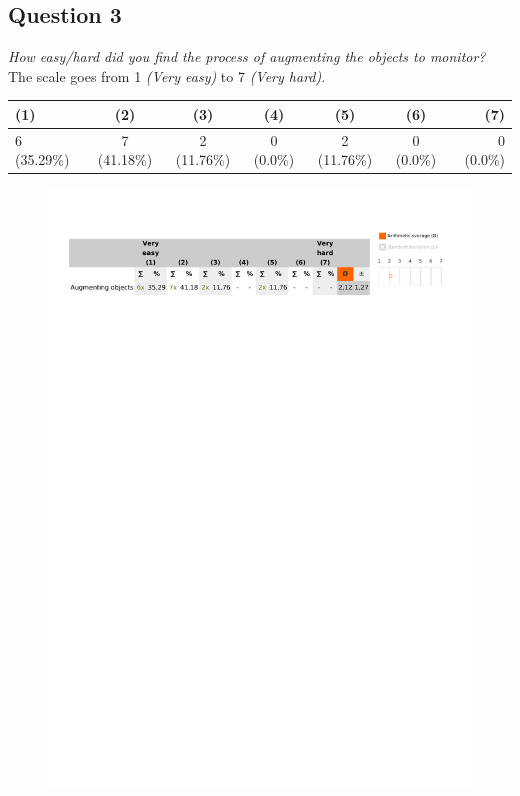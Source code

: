 \subsection{Question 3}\label{question2:3}
\emph{How easy/hard did you find the process of augmenting the objects to monitor?}\\

The scale goes from 1 \emph{(Very easy)} to 7 \emph{(Very hard)}.
\begin{table}[H]
	\begin{center}
		\small \begin{tabular*}{1.15\columnwidth}{lcccccr}
			\\ \hline \hline
			(1) & (2) & (3) & (4) & (5) & (6) & (7) \\ \hline \hline

		 	6 (35.29\%) & 7 (41.18\%) & 2 (11.76\%) & 0 (0.0\%) & 2 (11.76\%) & 0 (0.0\%) & 0 (0.0\%)\\ \hline
		\end{tabular*}
	\end{center}
\end{table}

\begin{figure}[H]
	\centering
	\includegraphics[width=0.6\linewidth]{gfx/Chapter_EvaluationResults/ChildproofTask/question3}
\end{figure}

